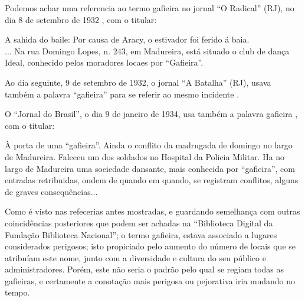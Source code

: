 
Podemos achar uma referencia ao termo gafieira no jornal ``O Radical'' (RJ),
no dia 8 de setembro de 1932 \cite[pp. 12]{gafieirajournaloradical1},
com o titular:
\begin{citando}%
A sahida do baile: Por causa de Aracy, o estivador foi ferido á baia.\\
... Na rua Domingo Lopes, n. 243, em Madureira, está situado o club de dança Ideal, 
conhecido pelos moradores locaes por ``Gafieira''.
\end{citando} 
Ao dia seguinte, 9 de setembro de 1932, o jornal ``A Batalha'' (RJ), 
usava também a palavra ``gafieira'' para se referir ao mesmo incidente \cite[pp. 8]{gafieirajournalabatalha1}.

O ``Jornal do Brasil'', o dia 9 de janeiro de 1934, 
usa também a palavra gafieira \cite[pp. 11]{gafieirajournalbrasil1}, com o titular:
\begin{citando}%
À porta de uma ``gafieira''.
Ainda o conflito da madrugada de domingo no largo de Madureira.
Faleceu um dos soldados no Hospital da Policia Militar. 
Ha no largo de Madureira uma sociedade dansante, mais conhecida por ``gafieira'', 
com entradas retribuidas, ondem de quando em quando, se registram conflitos, 
alguns de graves consequências...
\end{citando} 
Como é visto nas refecerias antes mostradas, e guardando semelhança com outras coincidências
posteriores que podem ser achadas na ``Biblioteca Digital da Fundação Biblioteca Nacional''; 
o termo gafieira, estava associado a lugares considerados perigosos;
isto propiciado pelo aumento do número de locais que se atribuíam este nome, junto com 
a diversidade e cultura  do seu público e administradores.
Porém, este não seria o padrão pelo qual se regiam todas as gafieiras, 
e certamente a conotação mais perigosa ou pejorativa iria mudando no tempo. 


